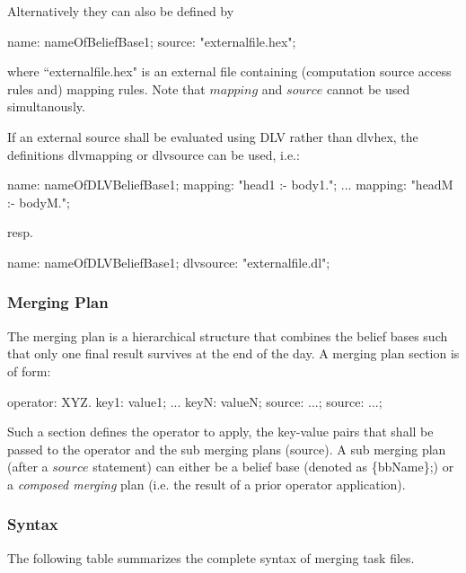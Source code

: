 \documentclass[a4paper,11pt]{article}
\theoremstyle{definition}
\newcommand{\dlv}{\textsf{DLV}\xspace }
\newcommand{\dlvhex}{\textsf{dlvhex}\xspace }
\newcommand{\inlinecode}[1]{\textsf{#1}\xspace }
\begin{document}
				Alternatively they can also be defined by
				\begin{exampleprogram}
name: nameOfBeliefBase1;
source: "externalfile.hex";
				\end{exampleprogram}
				where ``externalfile.hex" is an external file containing (computation source access rules and) mapping rules. Note that $\mathit{mapping}$ and $\mathit{source}$
				cannot be used simultanously.

				If an external source shall be evaluated using \dlv rather than \dlvhex, the definitions \inlinecode{dlvmapping} or \inlinecode{dlvsource} can be used, i.e.:
				\begin{exampleprogram}
name: nameOfDLVBeliefBase1;
mapping: "head1 :- body1.";
...
mapping: "headM :- bodyM.";
				\end{exampleprogram}
resp.
				\begin{exampleprogram}
name: nameOfDLVBeliefBase1;
dlvsource: "externalfile.dl";
				\end{exampleprogram}

			\subsubsection{Merging Plan}
			
				The merging plan is a hierarchical structure that combines the belief bases such that only one final result survives at the end of the day. A merging plan section is of
				form:
				\begin{exampleprogram}
operator: XYZ.
key1: value1;
...
keyN: valueN;
source: ...;
source: ...;
				\end{exampleprogram}
				Such a section defines the operator to apply, the key-value pairs that shall be passed to the operator and the sub merging plans (\inlinecode{source}). A sub merging plan
				(after a $\mathit{source}$ statement) can either be a belief base (denoted as \inlinecode{\{bbName\};}) or a \emph{composed merging} plan (i.e. the result of a prior operator application).

			\subsubsection{Syntax}
			
				The following table summarizes the complete syntax of merging task files.
						
\end{document}
